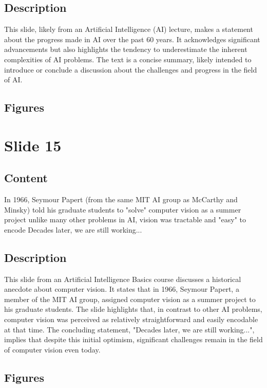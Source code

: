 \documentclass{article}%
\begin{document}
\subsection{Description}%
This slide, likely from an Artificial Intelligence (AI) lecture, makes a statement about the progress made in AI over the past 60 years.  It acknowledges significant advancements but also highlights the tendency to underestimate the inherent complexities of AI problems. The text is a concise summary, likely intended to introduce or conclude a discussion about the challenges and progress in the field of AI.%
\subsection{Figures}%
\begin{figure}[H]%
\centering%
\end{figure}

%
\newpage%
\section{Slide 15}%
\label{sec:Slide15}%
\subsection{Content}%

In 1966, Seymour Papert (from the same MIT AI group as McCarthy and Minsky) told his graduate students to "solve" computer vision as a summer project unlike many other problems in AI, vision was tractable and "easy" to encode Decades later, we are still working...
%
\subsection{Description}%
This slide from an Artificial Intelligence Basics course discusses a historical anecdote about computer vision. It states that in 1966, Seymour Papert, a member of the MIT AI group, assigned computer vision as a summer project to his graduate students.  The slide highlights that, in contrast to other AI problems, computer vision was perceived as relatively straightforward and easily encodable at that time.  The concluding statement, "Decades later, we are still working...", implies that despite this initial optimism, significant challenges remain in the field of computer vision even today.%
\subsection{Figures}%
\begin{figure}[H]%
\centering%
\end{figure}
\end{document}
